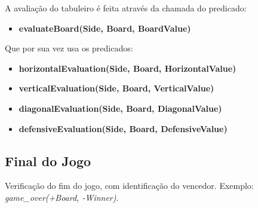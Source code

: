 \documentclass[a4paper]{article}
\begin{document}
A avaliação do tabuleiro é feita através da chamada do predicado:
\begin{itemize}
	\item \textbf{evaluateBoard(Side, Board, BoardValue)}
\end{itemize}

Que por sua vez usa os predicados:
\begin{itemize}
	\item \textbf{horizontalEvaluation(Side, Board, HorizontalValue)}
	\item \textbf{verticalEvaluation(Side, Board, VerticalValue)}
	\item \textbf{diagonalEvaluation(Side, Board, DiagonalValue)}
	\item \textbf{defensiveEvaluation(Side, Board, DefensiveValue)}
\end{itemize}

\newpage

\subsection{Final do Jogo} Verificação do fim do jogo, com identificação do vencedor. Exemplo: \textit{game\_over(+Board, -Winner)}.
\end{document}
